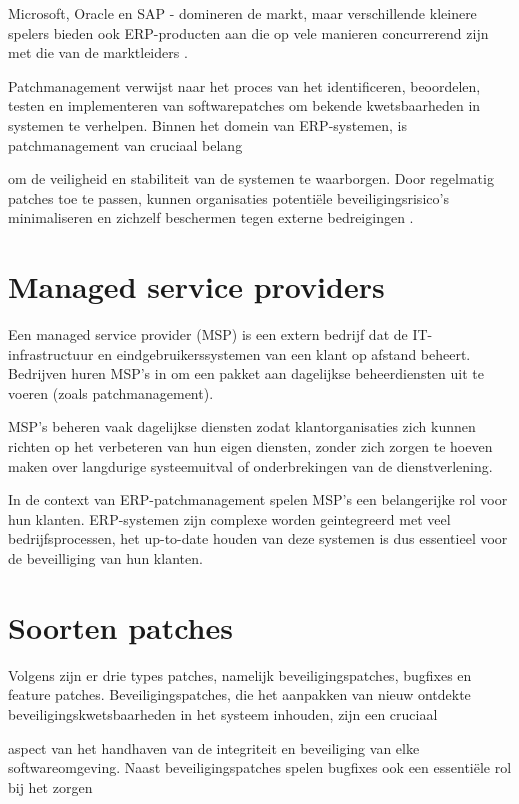 Microsoft, Oracle en SAP - domineren de markt, maar verschillende kleinere spelers bieden ook ERP-producten aan die op vele manieren concurrerend zijn met die van de marktleiders \autocite{Pratt2023}.

Patchmanagement verwijst naar het proces van het identificeren, beoordelen, testen en implementeren van softwarepatches om bekende kwetsbaarheden in systemen te verhelpen. Binnen het domein van ERP-systemen, is patchmanagement van cruciaal belang

om de veiligheid en stabiliteit van de systemen te waarborgen. Door regelmatig patches toe te passen, kunnen organisaties potentiële beveiligingsrisico's minimaliseren en zichzelf beschermen tegen externe bedreigingen \autocite{Buenning2024}.

\section{Managed service providers}

Een managed service provider (MSP) is een extern bedrijf dat de IT-infrastructuur en eindgebruikerssystemen van een klant op afstand beheert. Bedrijven huren MSP's in om een pakket aan dagelijkse beheerdiensten uit te voeren (zoals patchmanagement).

MSP's beheren vaak dagelijkse diensten zodat klantorganisaties zich kunnen richten op het verbeteren van hun eigen diensten, zonder zich zorgen te hoeven maken over langdurige systeemuitval of onderbrekingen van de dienstverlening.

In de context van ERP-patchmanagement spelen MSP's een belangerijke rol voor hun klanten. ERP-systemen zijn complexe worden geintegreerd met veel bedrijfsprocessen, het up-to-date houden van deze systemen is dus essentieel voor de beveilliging van hun klanten. \autocite{Gillis2021}

\section{Soorten patches}
Volgens \textcite{Buenning2024} zijn er drie types patches, namelijk beveiligingspatches, bugfixes en feature patches. Beveiligingspatches, die het aanpakken van nieuw ontdekte beveiligingskwetsbaarheden in het systeem inhouden, zijn een cruciaal
 
aspect van het handhaven van de integriteit en beveiliging van elke softwareomgeving. Naast beveiligingspatches spelen bugfixes ook een essentiële rol bij het zorgen 


